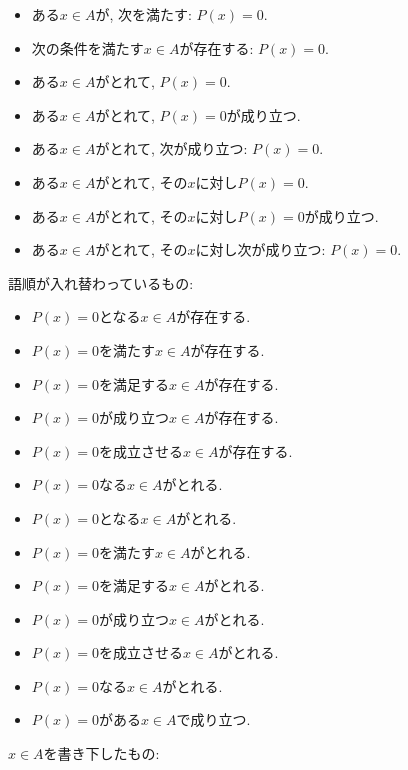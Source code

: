 \documentclass[a4paper,12pt,draft]{amsart}
\begin{document}
\begin{itemize}
\item ある$x\in A$が, 次を満たす: $P(x)=0$.
\item 次の条件を満たす$x\in A$が存在する: $P(x)=0$.
\item ある$x\in A$がとれて, $P(x)=0$.
\item ある$x\in A$がとれて, $P(x)=0$が成り立つ.
\item ある$x\in A$がとれて, 次が成り立つ: $P(x)=0$.
\item ある$x\in A$がとれて, その$x$に対し$P(x)=0$.
\item ある$x\in A$がとれて, その$x$に対し$P(x)=0$が成り立つ.
\item ある$x\in A$がとれて, その$x$に対し次が成り立つ: $P(x)=0$.
\end{itemize}
語順が入れ替わっているもの:
\begin{itemize}
\item $P(x)=0$となる$x\in A$が存在する.
\item $P(x)=0$を満たす$x\in A$が存在する.
\item $P(x)=0$を満足する$x\in A$が存在する.
\item $P(x)=0$が成り立つ$x\in A$が存在する.
\item $P(x)=0$を成立させる$x\in A$が存在する.
\item $P(x)=0$なる$x\in A$がとれる.
\item $P(x)=0$となる$x\in A$がとれる.
\item $P(x)=0$を満たす$x\in A$がとれる.
\item $P(x)=0$を満足する$x\in A$がとれる.
\item $P(x)=0$が成り立つ$x\in A$がとれる.
\item $P(x)=0$を成立させる$x\in A$がとれる.
\item $P(x)=0$なる$x\in A$がとれる.
\item $P(x)=0$がある$x\in A$で成り立つ.
\end{itemize}
$x\in A$を書き下したもの:
\end{document}
